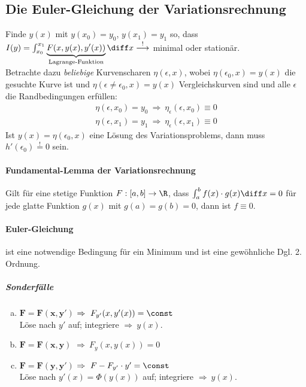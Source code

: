 	\subsection{Die Euler-Gleichung der Variationsrechnung} %
		Finde $y(x)$ mit $y(x_0) = y_0$, $y(x_1) = y_1$ so, dass $I(y) = \int_{x_0}^{x_1} \underbrace{F(x,y(x),y'(x))}_\text{Lagrange-Funktion} \diff x \stackrel{!}{\longrightarrow}$ minimal oder stationär. \\
		Betrachte dazu \emph{beliebige} Kurvenscharen $\eta(\epsilon,x)$, wobei $\eta(\epsilon_0,x) = y(x)$ die gesuchte Kurve ist und $\eta(\epsilon \neq \epsilon_0,x) = y(x)$ Vergleichskurven sind und alle $\epsilon$ die Randbedingungen erfüllen:
		\begin{gather*}
			\eta(\epsilon,x_0) = y_0 \ \Rightarrow \ \eta_\epsilon(\epsilon,x_0) \equiv 0 \\
			\eta(\epsilon,x_1) = y_1 \ \Rightarrow \ \eta_\epsilon(\epsilon,x_1) \equiv 0
		\end{gather*}
		Ist $y(x) = \eta(\epsilon_0, x)$ eine Lösung des Variationsproblems, dann muss $h'(\epsilon_0) \stackrel{!}{=} 0$ sein.

		\paragraph{Fundamental-Lemma der Variationsrechnung} %
			Gilt für eine stetige Funktion $F: [a, b] \to \R$, dass $\int_a^b f(x) \cdot g(x) \diff x = 0$ für jede glatte Funktion $g(x)$ mit $g(a) = g(b) = 0$, dann ist $f \equiv 0$.
		
		\paragraph{Euler-Gleichung} %
			ist eine notwendige Bedingung für ein Minimum und ist eine gewöhnliche Dgl. 2. Ordnung.
			\subparagraph{Sonderfälle} %
				\begin{enumerate}[a)]
					\item $\boldsymbol{F = F(x,y')}$
						$
							\Rightarrow \ F_{y'}(x,y'(x)) = \const
						$ \\
						Löse nach $y'$ auf; integriere $\Rightarrow \ y(x)$.
						
					\item $\boldsymbol{F = F(x,y)}$
						$
							\Rightarrow \ F_y(x,y(x)) = 0
						$
						
					\item $\boldsymbol{F = F(y,y')}$
						$
							\Rightarrow \ F - F_{y'} \cdot y' = \const
						$ \\
						Löse nach $y'(x) = \Phi(y(x))$ auf; integriere $\Rightarrow \ y(x)$.
				\end{enumerate}
	
